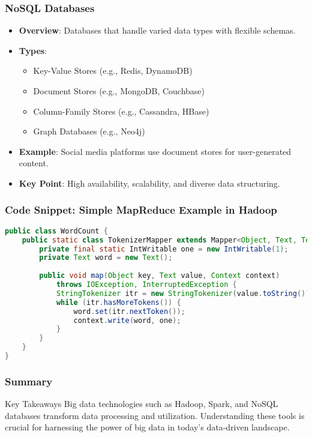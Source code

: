 \documentclass[aspectratio=169]{beamer}
\begin{document}
\begin{frame}
    \frametitle{NoSQL Databases}
    \begin{itemize}
        \item \textbf{Overview}: Databases that handle varied data types with flexible schemas.
        \item \textbf{Types}:
            \begin{itemize}
                \item Key-Value Stores (e.g., Redis, DynamoDB)
                \item Document Stores (e.g., MongoDB, Couchbase)
                \item Column-Family Stores (e.g., Cassandra, HBase)
                \item Graph Databases (e.g., Neo4j)
            \end{itemize}
        \item \textbf{Example}: Social media platforms use document stores for user-generated content.
        \item \textbf{Key Point}: High availability, scalability, and diverse data structuring.
    \end{itemize}
\end{frame}

\begin{frame}[fragile]
    \frametitle{Code Snippet: Simple MapReduce Example in Hadoop}
    \begin{lstlisting}[language=java]
public class WordCount {
    public static class TokenizerMapper extends Mapper<Object, Text, Text, IntWritable> {
        private final static IntWritable one = new IntWritable(1);
        private Text word = new Text();
        
        public void map(Object key, Text value, Context context) 
            throws IOException, InterruptedException {
            StringTokenizer itr = new StringTokenizer(value.toString());
            while (itr.hasMoreTokens()) {
                word.set(itr.nextToken());
                context.write(word, one);
            }
        }
    }
}
    \end{lstlisting}
\end{frame}

\begin{frame}
    \frametitle{Summary}
    \begin{block}{Key Takeaways}
        Big data technologies such as Hadoop, Spark, and NoSQL databases transform data processing and utilization. Understanding these tools is crucial for harnessing the power of big data in today’s data-driven landscape.
    \end{block}
\end{frame}
\end{document}
